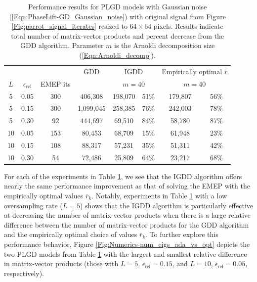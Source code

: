 \begin{table}[H]
\centering
\begin{tabular}{ |ccc|c|cc|cc| }
 \hline
			&&&  GDD
			&	\multicolumn{2}{c|}{IGDD }
			&  \multicolumn{2}{c|}{ Empirically optimal $\bar{r}$ }	\\
$L$ & $\epsilon_\text{rel}$ & EMEP its &  	& \multicolumn{2}{c|}{ $m=40$ }  & \multicolumn{2}{c|}{$m=40$}   \\
 \hline
 5 &  0.05 & 300 &  406,308  &  198,070 & 51\% &  179,807 & 56\%  \\ 
  5 &  0.15 & 300 & 1,099,045  &  258,385 & 76\% &  242,003 & 78\%  \\ 
  5 &  0.30 &  92 &  444,697  &   69,510 & 84\% &   58,780 & 87\%  \\ 
 10 &  0.05 & 153 &   80,453  &   68,709 & 15\% &   61,948 & 23\%  \\ 
 10 &  0.15 & 108 &   88,317  &   57,231 & 35\% &   51,311 & 42\%  \\ 
 10 &  0.30 &  54 &   72,486  &   25,809 & 64\% &   23,217 & 68\%  \\ 
 \hline
\end{tabular}
\vspace{0.5cm}
\caption{
Performance results for PLGD models with Gaussian noise (\ref{Eqn:PhaseLift-GD_Gaussian_noise}) with original signal from Figure \ref{Fig:parrot_signal_iterates} resized to $64 \times 64$ pixels.
Results indicate total number of matrix-vector products and percent decrease from the GDD algorithm.
Parameter $m$ is the Arnoldi decomposition size (\ref{Eqn:Arnoldi_decomp}).
} \label{Tab:Numerics-num_matvecs_opt_vs_ada}
\end{table}


For each of the experiments in Table \ref{Tab:Numerics-num_matvecs_opt_vs_ada}, we see that the IGDD algorithm offers nearly the same performance improvement as that of solving the EMEP with the empirically optimal values $\bar{r}_k$.
Notably, experiments in Table \ref{Tab:Numerics-num_matvecs_opt_vs_ada} with a low oversampling rate ($L=5$) shows that the IGDD algorithm is particularly effective at decreasing the number of matrix-vector products when there is a large relative difference between the number of matrix-vector products for the GDD algorithm and the empirically optimal choice of values $\bar{r}_k$.
To further explore this performance behavior, Figure \ref{Fig:Numerics-num_eigs_ada_vs_opt} depicts the two PLGD models from Table \ref{Tab:Numerics-num_matvecs_opt_vs_ada} with the largest and smallest relative difference in matrix-vector products (those with $L=5$, $\epsilon_\text{rel} = 0.15$, and $L=10$, $\epsilon_\text{rel} = 0.05$, respectively).




